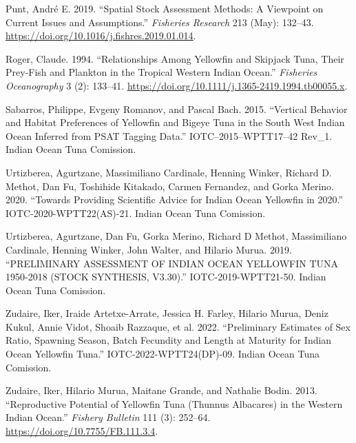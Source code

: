 \documentclass[
]{scrartcl}
\newlength{\cslhangindent}
\newenvironment{CSLReferences}[2] %
 {\begin{list}{}{%
  \setlength{\itemindent}{0pt}
  \setlength{\leftmargin}{0pt}
  \setlength{\parsep}{0pt}
  \ifodd #1
   \setlength{\leftmargin}{\cslhangindent}
   \setlength{\itemindent}{-1\cslhangindent}
  \fi
  \setlength{\itemsep}{#2\baselineskip}}}
 {\end{list}}
\begin{document}
\begin{CSLReferences}{1}{0}
Punt, André E. 2019. {``Spatial Stock Assessment Methods: {A} Viewpoint
on Current Issues and Assumptions.''} \emph{Fisheries Research} 213
(May): 132--43. \url{https://doi.org/10.1016/j.fishres.2019.01.014}.

Roger, Claude. 1994. {``Relationships Among Yellowfin and Skipjack Tuna,
Their Prey-Fish and Plankton in the Tropical Western {Indian Ocean}.''}
\emph{Fisheries Oceanography} 3 (2): 133--41.
\url{https://doi.org/10.1111/j.1365-2419.1994.tb00055.x}.

Sabarros, Philippe, Evgeny Romanov, and Pascal Bach. 2015. {``Vertical
Behavior and Habitat Preferences of Yellowfin and Bigeye Tuna in the
{South West Indian Ocean} Inferred from {PSAT} Tagging Data.''}
IOTC--2015--WPTT17--42 Rev\_1. Indian Ocean Tuna Comission.

Urtizberea, Agurtzane, Massimiliano Cardinale, Henning Winker, Richard
D. Methot, Dan Fu, Toshihide Kitakado, Carmen Fernandez, and Gorka
Merino. 2020. {``Towards Providing Scientific Advice for {Indian Ocean}
Yellowfin in 2020.''} IOTC-2020-WPTT22(AS)-21. Indian Ocean Tuna
Comission.

Urtizberea, Agurtzane, Dan Fu, Gorka Merino, Richard D Methot,
Massimiliano Cardinale, Henning Winker, John Walter, and Hilario Murua.
2019. {``{PRELIMINARY ASSESSMENT OF INDIAN OCEAN YELLOWFIN TUNA}
1950-2018 ({STOCK SYNTHESIS}, {V3}.30).''} IOTC-2019-WPTT21-50. Indian
Ocean Tuna Comission.

Zudaire, Iker, Iraide Artetxe-Arrate, Jessica H. Farley, Hilario Murua,
Deniz Kukul, Annie Vidot, Shoaib Razzaque, et al. 2022. {``Preliminary
Estimates of Sex Ratio, Spawning Season, Batch Fecundity and Length at
Maturity for {Indian Ocean} Yellowfin Tuna.''} IOTC-2022-WPTT24(DP)-09.
Indian Ocean Tuna Comission.

Zudaire, Iker, Hilario Murua, Maitane Grande, and Nathalie Bodin. 2013.
{``Reproductive Potential of {Yellowfin Tuna} ({Thunnus} Albacares) in
the Western {Indian Ocean}.''} \emph{Fishery Bulletin} 111 (3): 252--64.
\url{https://doi.org/10.7755/FB.111.3.4}.

\end{CSLReferences}
\end{document}

